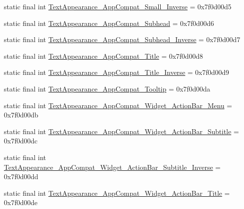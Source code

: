 \begin{DoxyCompactItemize}
\item 
static final int \mbox{\hyperlink{classandroid_1_1support_1_1v7_1_1appcompat_1_1_r_1_1style_a3c7b4f535d06f2b882bc1bf42cbccea7}{Text\+Appearance\+\_\+\+App\+Compat\+\_\+\+Small\+\_\+\+Inverse}} = 0x7f0d00d5
\item 
static final int \mbox{\hyperlink{classandroid_1_1support_1_1v7_1_1appcompat_1_1_r_1_1style_a898c904d8860090b71256fea299d0331}{Text\+Appearance\+\_\+\+App\+Compat\+\_\+\+Subhead}} = 0x7f0d00d6
\item 
static final int \mbox{\hyperlink{classandroid_1_1support_1_1v7_1_1appcompat_1_1_r_1_1style_ad5e427783ecc5b5eb78038cc5e29ecc8}{Text\+Appearance\+\_\+\+App\+Compat\+\_\+\+Subhead\+\_\+\+Inverse}} = 0x7f0d00d7
\item 
static final int \mbox{\hyperlink{classandroid_1_1support_1_1v7_1_1appcompat_1_1_r_1_1style_a673070a66526923c44e85b82bfeed62d}{Text\+Appearance\+\_\+\+App\+Compat\+\_\+\+Title}} = 0x7f0d00d8
\item 
static final int \mbox{\hyperlink{classandroid_1_1support_1_1v7_1_1appcompat_1_1_r_1_1style_a53b6dccae2ab8fbf4a64fa6e8b3e4952}{Text\+Appearance\+\_\+\+App\+Compat\+\_\+\+Title\+\_\+\+Inverse}} = 0x7f0d00d9
\item 
static final int \mbox{\hyperlink{classandroid_1_1support_1_1v7_1_1appcompat_1_1_r_1_1style_ac5978ff086288051c1546ca21a6b5aac}{Text\+Appearance\+\_\+\+App\+Compat\+\_\+\+Tooltip}} = 0x7f0d00da
\item 
static final int \mbox{\hyperlink{classandroid_1_1support_1_1v7_1_1appcompat_1_1_r_1_1style_a42bd18afa75f3029cd3cba58b6dbbd97}{Text\+Appearance\+\_\+\+App\+Compat\+\_\+\+Widget\+\_\+\+Action\+Bar\+\_\+\+Menu}} = 0x7f0d00db
\item 
static final int \mbox{\hyperlink{classandroid_1_1support_1_1v7_1_1appcompat_1_1_r_1_1style_a060fdc4b1fab528d2a11af1ff7af10a8}{Text\+Appearance\+\_\+\+App\+Compat\+\_\+\+Widget\+\_\+\+Action\+Bar\+\_\+\+Subtitle}} = 0x7f0d00dc
\item 
static final int \mbox{\hyperlink{classandroid_1_1support_1_1v7_1_1appcompat_1_1_r_1_1style_ad09887d0863f622563a04c345872e644}{Text\+Appearance\+\_\+\+App\+Compat\+\_\+\+Widget\+\_\+\+Action\+Bar\+\_\+\+Subtitle\+\_\+\+Inverse}} = 0x7f0d00dd
\item 
static final int \mbox{\hyperlink{classandroid_1_1support_1_1v7_1_1appcompat_1_1_r_1_1style_a85ad5971aea90f7ccb526eb8740109e5}{Text\+Appearance\+\_\+\+App\+Compat\+\_\+\+Widget\+\_\+\+Action\+Bar\+\_\+\+Title}} = 0x7f0d00de
\item 

\end{DoxyCompactItemize}
